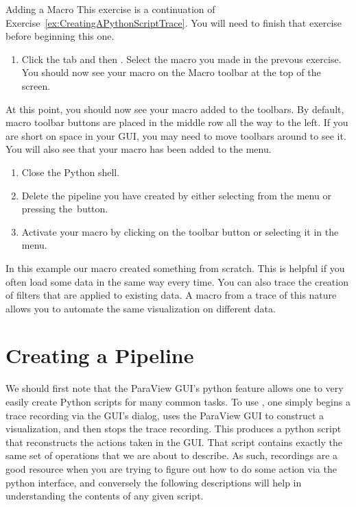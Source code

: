 \begin{exercise}{Adding a Macro}
  \label{ex:AddingAMacro}%
  This exercise is a continuation of
  Exercise~\ref{ex:CreatingAPythonScriptTrace}.  You will need to finish
  that exercise before beginning this one.

  \begin{enumerate}
  \item Click the  tab and then .  Select
   the macro you made in the prevous exercise.  You should now see 
   your macro on the Macro toolbar at the top of the screen.
  \end{enumerate}

  At this point, you should now see your macro added to the toolbars.  By
  default, macro toolbar buttons are placed in the middle row all the way
  to the left.  If you are short on space in your GUI, you may need to move
  toolbars around to see it.  You will also see that your macro has been
  added to the  menu.

  \begin{enumerate}
    \restorecounter
  \item Close the Python shell.
  \item Delete the pipeline you have created by either selecting 
    \ra {} from the menu or pressing the~\disconnect button.
  \item Activate your macro by clicking on the toolbar button or selecting
    it in the  menu.
  \end{enumerate}

  In this example our macro created something from scratch.  This is
  helpful if you often load some data in the same way every time.  You can
  also trace the creation of filters that are applied to existing data.  A
  macro from a trace of this nature allows you to automate the same
  visualization on different data.
\end{exercise}

\section{Creating a Pipeline}
\label{sec:CreatingAPipeline}

We should first note that the ParaView GUI's python  feature
allows one to very easily create Python scripts for many common
tasks. To use , one simply begins a trace recording via the GUI's
 dialog, uses the ParaView GUI to construct a
visualization, and then stops the trace recording. This produces a
python script that reconstructs the actions taken in the GUI. That
script contains exactly the same set of operations that we are
about to describe. As such,  recordings are a good resource when
you are trying to figure out how to do some action via the python
interface, and conversely the following descriptions will help in
understanding the contents of any given  script.

